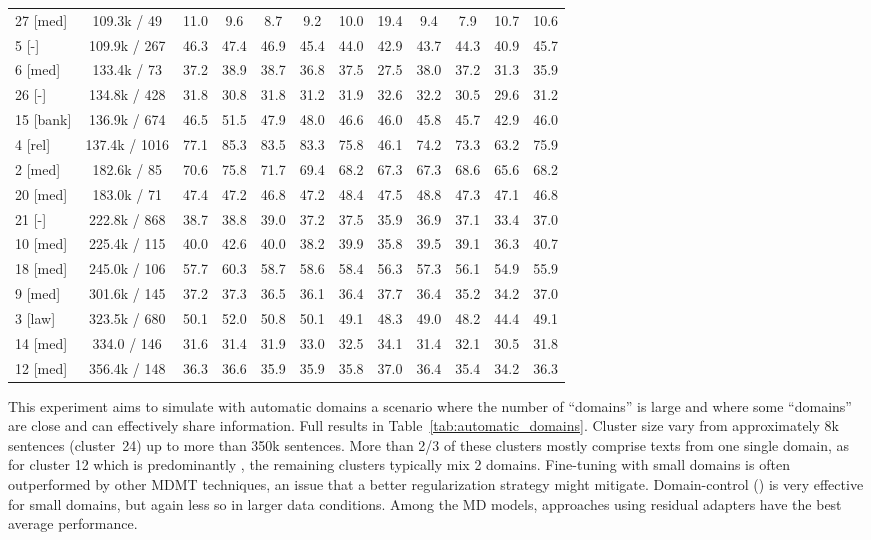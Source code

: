 \begin{table*}[t]
\begin{tabular}{|p{1.3cm}|*{11}{c|}}
27 \hfill [med]&109.3k / 49&11.0&9.6&8.7&9.2&10.0&19.4&9.4&7.9&10.7&10.6 \\
5 \hfill [-]&109.9k / 267&46.3&47.4&46.9&45.4&44.0&42.9&43.7&44.3&40.9&45.7 \\
6 \hfill [med]&133.4k / 73&37.2&38.9&38.7&36.8&37.5&27.5&38.0&37.2&31.3&35.9 \\
26 \hfill [-]&134.8k / 428&31.8&30.8&31.8&31.2&31.9&32.6&32.2&30.5&29.6&31.2 \\
15 \hfill [bank]&136.9k / 674&46.5&51.5&47.9&48.0&46.6&46.0&45.8&45.7&42.9&46.0 \\
4 \hfill [rel]&137.4k / 1016&77.1&85.3&83.5&83.3&75.8&46.1&74.2&73.3&63.2&75.9 \\
2 \hfill [med]&182.6k / 85&70.6&75.8&71.7&69.4&68.2&67.3&67.3&68.6&65.6&68.2 \\
20 \hfill [med]&183.0k / 71&47.4&47.2&46.8&47.2&48.4&47.5&48.8&47.3&47.1&46.8 \\
21 \hfill [-]&222.8k / 868&38.7&38.8&39.0&37.2&37.5&35.9&36.9&37.1&33.4&37.0 \\
10 \hfill [med]&225.4k / 115&40.0&42.6&40.0&38.2&39.9&35.8&39.5&39.1&36.3&40.7 \\
18 \hfill [med]&245.0k / 106&57.7&60.3&58.7&58.6&58.4&56.3&57.3&56.1&54.9&55.9 \\
9 \hfill [med]&301.6k / 145&37.2&37.3&36.5&36.1&36.4&37.7&36.4&35.2&34.2&37.0 \\
3 \hfill [law]&323.5k / 680&50.1&52.0&50.8&50.1&49.1&48.3&49.0&48.2&44.4&49.1 \\
14 \hfill [med]&334.0 / 146&31.6&31.4&31.9&33.0&32.5&34.1&31.4&32.1&30.5&31.8 \\
12 \hfill [med]&356.4k / 148&36.3&36.6&35.9&35.9&35.8&37.0&36.4&35.4&34.2&36.3 \\ \hline
  \end{tabular}
  \caption{Complete results for the experiments with automatic domains. For each cluster, we report: the majority domain when one domain accounts for more than 75\% of the class; training and test sizes; and BLEU scores obtained with the various systems used in this study. Most test sets are too small to report significance tests.}
  \label{tab:automatic_domains}
\end{table*}

This experiment aims to simulate with automatic domains a scenario where the number of ``domains'' is large and where some ``domains'' are close and can effectively share information. Full results in Table~\ref{tab:automatic_domains}. Cluster size vary from approximately 8k sentences (cluster~24) up to more than 350k sentences. More than 2/3 of these clusters mostly comprise texts from one single domain, as for cluster 12 which is predominantly , the remaining clusters typically mix 2 domains. Fine-tuning with small domains is often outperformed by other MDMT techniques, an issue that a better regularization strategy might mitigate. Domain-control () is very effective for small domains, but again less so in larger data conditions. Among the MD models, approaches using residual adapters have the best average performance.

